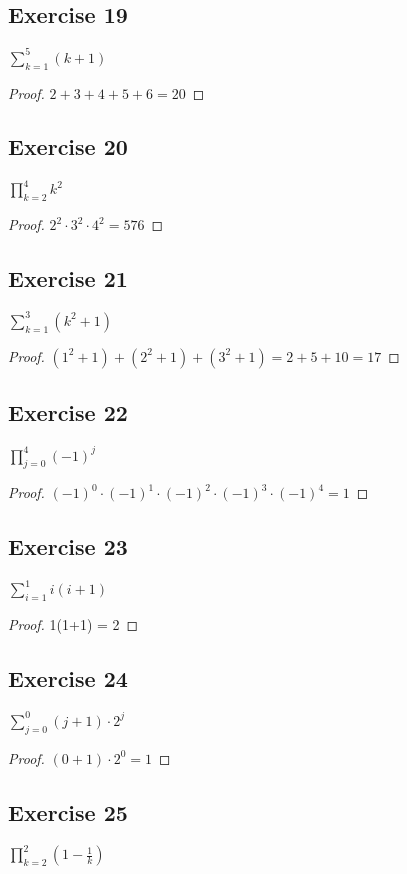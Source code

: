 \documentclass[14pt]{extarticle}
\newcommand{\dps}{\displaystyle}
\begin{document}
\subsection{Exercise 19}
$\dps\sum_{k=1}^{5}(k+1)$

\begin{proof}
$2+3+4+5+6=20$
\end{proof}

\subsection{Exercise 20}
$\dps\prod_{k=2}^{4}{k}^2$

\begin{proof}
$2^2\cdot 3^2\cdot 4^2 = 576$
\end{proof}

\subsection{Exercise 21}
$\dps\sum_{k=1}^{3}(k^2+1)$

\begin{proof}
$(1^2+1) + (2^2+1) + (3^2+1) = 2+5+10 = 17$
\end{proof}

\subsection{Exercise 22}
$\dps\prod_{j=0}^{4}{(-1)}^j$

\begin{proof}
$(-1)^0\cdot (-1)^1\cdot (-1)^2\cdot (-1)^3\cdot(-1)^4 = 1$
\end{proof}

\subsection{Exercise 23}
$\dps\sum_{i=1}^{1}i(i+1)$

\begin{proof}
1(1+1) = 2
\end{proof}

\subsection{Exercise 24}
$\dps\sum_{j=0}^{0}(j+1)\cdot2^j$

\begin{proof}
$(0+1)\cdot 2^0 = 1$
\end{proof}

\subsection{Exercise 25}
$\dps\prod_{k=2}^{2}\left(1 - \frac{1}{k}\right)$
\end{document}
